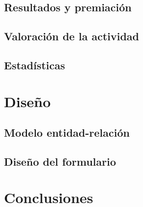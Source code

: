 \documentclass{article}
\begin{document}
\subsection{Resultados y premiación}

\subsection{Valoración de la actividad}

\subsection{Estadísticas}

\section{Diseño}

\subsection{Modelo entidad-relación}

\subsection{Diseño del formulario}

\section{Conclusiones}



\end{document}
